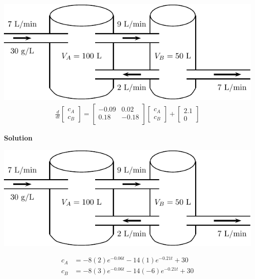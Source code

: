 ~\hfill \begin{minipage}[h]{0.45\linewidth}
\vspace{0pt}
\includegraphics[width=1.0\linewidth]{graphics/notes_09_tanks2}
\LARGE
  \begin{align*}
\frac{d}{dt}    
\begin{bmatrix} c_A \\ c_B 
    \end{bmatrix}
=
\begin{bmatrix}
-0.09 & 0.02 \\
0.18& -0.18 \\
\end{bmatrix}
\begin{bmatrix} c_A \\ c_B 
    \end{bmatrix}
+ 
\begin{bmatrix}
  2.1 \\ 0 
\end{bmatrix}
  \end{align*}
\end{minipage}

\newpage
\begin{center}
  {\bf Solution} 
\end{center}
\hfill 
\includegraphics[width=0.4\linewidth]{graphics/notes_09_tanks2}

\begin{align*}
  c_A & = -8(2) e^{-0.06t} - 14 (1) e^{-0.21t} + 30 \\
c_B & = -8(3) e^{-0.06t} - 14 (-6)  e^{-0.21t} + 30
\end{align*}

\begin{center}
\end{center}









